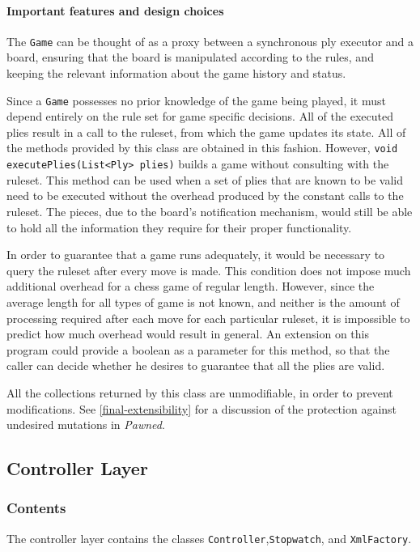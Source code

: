 			\paragraph{Important features and design choices} The \texttt{Game} can be thought of as a proxy 
						between a synchronous ply executor and a board, ensuring that the board is manipulated according
						to the rules, and keeping the relevant information about the game history and status. 
						
						Since a \texttt{Game} possesses no prior knowledge of the game being played, it must depend 
						entirely on the rule set for game specific decisions. All of the executed plies result in a call 
						to the ruleset, from which the game updates its state. All of the methods provided by this class are 
						obtained in this fashion. However, \texttt{void executePlies(List<Ply> plies)} builds a game without
						consulting with the ruleset. This method can be used when a set of plies that are known to be valid 
						need to be executed without the overhead produced by the constant calls to the ruleset. The 
						pieces, due to the board's notification mechanism, would still be able to hold all the information 
						they require for their proper functionality. 
						
						In order to guarantee that a game runs adequately, it would be necessary to query the ruleset after
						every move is made. This condition does not impose much additional overhead for a chess game
						of regular length. However, since the average length for all types of game is not known, 
						and neither is the amount of processing required after each move for each particular ruleset, 
						it is impossible to predict how much overhead would result in general. An extension on this program could
						provide a boolean as a parameter for this method, so that the caller can decide whether he desires
						to guarantee that all the plies are valid. 
						
						All the collections returned by this class are unmodifiable, in order to prevent modifications. See 
						\ref{final-extensibility} for a discussion of the protection against undesired mutations 
						in \emph{Pawned}. 
											
										
		\subsection{Controller Layer}
			\subsubsection{Contents}
				The controller layer contains the classes \texttt{Controller},\texttt{Stopwatch}, and \texttt{XmlFactory}. 

